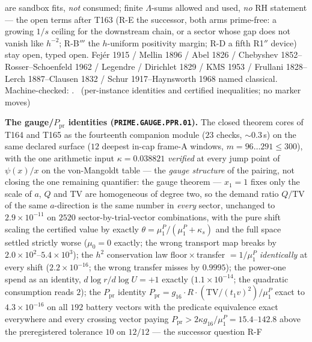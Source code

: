 are sandbox fits, \emph{not} consumed; finite $\Lambda$-sums allowed
and used, \emph{no} RH statement --- the open terms after T163 (R-E the
successor, both arms prime-free: a growing $1/s$ ceiling for the
downstream chain, or a sector whose gap does not vanish like $h^{-2}$;
R-B$'''$ the $h$-uniform positivity margin; R-D a fifth R1$''$ device)
stay open, typed open.
Fej\'er 1915 / Mellin 1896 / Abel 1826 / Chebyshev
1852--Rosser--Schoenfeld 1962 / Legendre / Dirichlet 1829 / KMS 1953 /
Frullani 1828--Lerch 1887--Clausen 1832 / Schur 1917--Haynsworth 1968
named classical. Machine-checked:
.
\mE\ (per-instance identities and certified inequalities; no marker moves)
\par\smallskip


\par\smallskip\noindent\textbf{The gauge/$P_{\mathrm{pr}}$ identities
(\texttt{PRIME.GAUGE.PPR.01}).}
The closed theorem cores of T164 and T165 as the fourteenth companion
module ($23$ checks, ${\sim}0.3$\,s) on the same declared surface ($12$
deepest in-cap frame-A windows, $m=96\ldots291\le300$), with the one
arithmetic input $\kappa=0.038821$ \emph{verified} at every jump point
of $\psi(x)/x$ on the von-Mangoldt table --- the \emph{gauge structure}
of the pairing, not closing the one remaining quantifier: the gauge
theorem --- $x_1=1$ fixes only the scale of $a$, $Q$ and TV are
homogeneous of degree two, so the demand ratio $Q/\mathrm{TV}$ of the
same $a$-direction is the same number in \emph{every} sector, unchanged
to $2.9\times10^{-11}$ on $2520$ sector-by-trial-vector combinations,
with the pure shift scaling the certified value by exactly
$\theta=\mu^P_1/(\mu^P_1+\kappa_s)$ and the full space settled strictly
worse ($\mu_0=0$ exactly; the wrong transport map breaks by
$2.0\times10^{2}$--$5.4\times10^{3}$); the $h^2$ conservation law
floor${}\times{}$transfer $=1/\mu^P_1$ \emph{identically} at every shift
($2.2\times10^{-16}$; the wrong transfer misses by $0.9995$); the
power-one spend as an identity, $d\log r/d\log U=+1$ exactly
($1.1\times10^{-14}$; the quadratic consumption reads $2$); the
$P_{\mathrm{pr}}$ identity
$P_{\mathrm{pr}}=g_{16}\cdot R\cdot(\mathrm{TV}/(t_1v)^2)/\mu^P_1$ exact
to $4.3\times10^{-16}$ on all $192$ battery vectors with the predicate
equivalence exact everywhere and every crossing vector paying
$P_{\mathrm{pr}}>2\kappa g_{16}/\mu^P_1=15.4$--$142.8$ above the
preregistered tolerance $10$ on $12/12$ --- the successor question R-F
